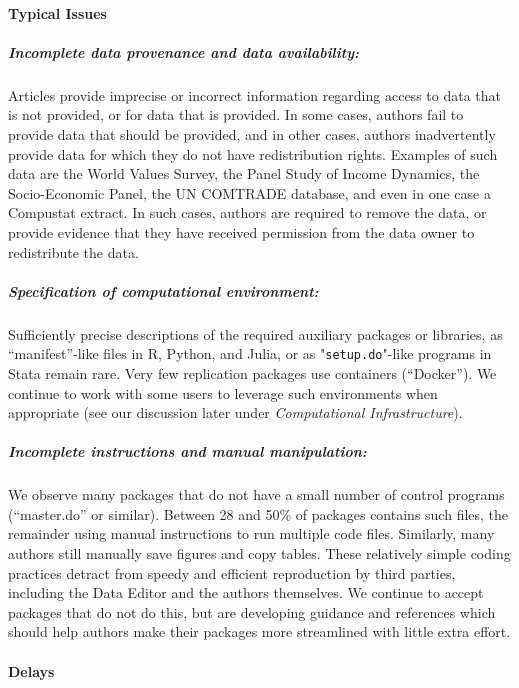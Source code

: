 \paragraph{Typical Issues}


\subparagraph{Incomplete data provenance and data availability:} Articles  provide imprecise or incorrect information regarding access to data that is not provided, or for data that is provided. In some cases, authors fail to provide data that should be provided, and in other cases, authors inadvertently provide data for which they do not have redistribution rights. Examples of such data are the World Values Survey, the Panel Study of Income Dynamics, the Socio-Economic Panel, the UN COMTRADE database, and even in one case a Compustat extract. In such cases, authors are required to remove the data, or provide evidence that they have received permission from the data owner to redistribute the data. 

\subparagraph{Specification of computational environment:}
Sufficiently precise descriptions of the required auxiliary packages or libraries, as ``manifest''-like files in R, Python, and Julia, or as "\texttt{setup.do}"-like programs in Stata remain rare. Very few replication packages use containers (``Docker''). We continue to work with some users to leverage such environments when appropriate (see our discussion later under \textit{Computational Infrastructure}).

\subparagraph{Incomplete instructions and manual manipulation:} We observe many packages that do not have a small number of control programs (``master.do'' or similar). Between 28 and 50\% of packages contains such files, the remainder using manual instructions to run multiple code files. Similarly, many authors still manually  save figures and copy  tables. These relatively simple coding practices detract from speedy and efficient reproduction by third parties, including the Data Editor and the authors themselves. We continue to accept packages that do not do this, but are developing guidance and references which should help authors make their packages more streamlined with little extra effort.


\paragraph{Delays} 

